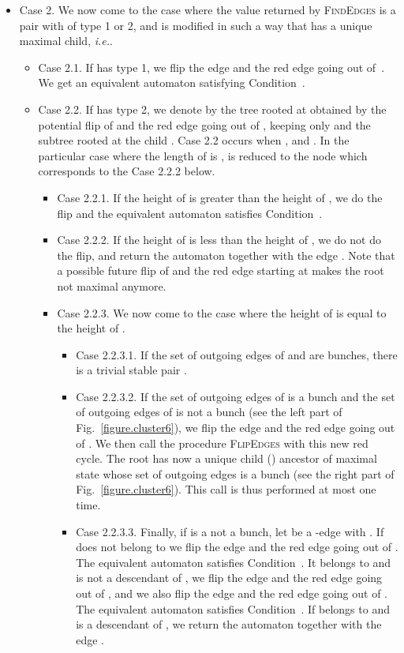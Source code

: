 \documentclass[11pt,a4paper]{article}
\newcommand{\ie}{{\itshape i.e.}\xspace }
\begin{document}
\begin{itemize}
\item Case 2. We now come to the case where the value returned by
  \textsc{FindEdges} is a pair  with  of
  type 1 or 2, and  is modified in such a way that 
  has a unique maximal child, \ie .
\begin{itemize}
\item Case 2.1.  If  has type 1, we flip the edge
   and the red edge going out of~. We get an
  equivalent automaton satisfying Condition~.
\item Case 2.2.  If  has type 2, we denote by 
  the tree rooted at  obtained by the potential flip of
   and the red edge going out of , keeping only
   and the subtree rooted at the child .  Case 2.2 occurs
  when ,  and . In the particular case where the
  length of  is ,  is reduced to the node  which
  corresponds to the Case 2.2.2 below.
\begin{itemize}
\item Case 2.2.1.  If the height of  is greater than the height
  of , we do the flip and the equivalent automaton satisfies
  Condition~.  
\item Case 2.2.2.  If the height of  is less than the height of
  , we do not do the flip, and return the automaton together with
  the edge . Note that a possible future flip of
   and the red edge starting at  makes the root
   not maximal anymore.
\item Case 2.2.3.  
We now come to the case where the height
  of  is equal to the height of .  
\begin{itemize}
\item Case 2.2.3.1.  If the set of outgoing edges of  and 
  are bunches, there is a trivial stable pair .
\item Case 2.2.3.2.
If the set of outgoing edges of  is a bunch and
  the set of outgoing edges of  is not a bunch (see the left
  part of Fig.~\ref{figure.cluster6}), we flip the edge
   and the red edge going out of .  We then call
  the procedure \textsc{FlipEdges} with this new red
  cycle. The root  has now a unique child () ancestor of
  maximal state whose set of outgoing edges is a bunch (see the right
  part of Fig.~\ref{figure.cluster6}).  This call is thus performed
  at most one time.  
\item Case 2.2.3.3.
Finally, if  is a not a bunch, let
   be a -edge with .  If  does not
  belong to  we flip the edge  and the red edge
  going out of .  The equivalent automaton satisfies
  Condition~. It  belongs to  and is not a descendant of
  , we flip the edge  and the red edge going out
  of , and we also flip the edge  and the red edge
  going out of .  The equivalent automaton satisfies
  Condition~.  If  belongs to  and is a descendant of
  , we return the automaton together with the edge
  .
\end{itemize}
\end{itemize}
\end{itemize}





\end{itemize}
\end{document}
